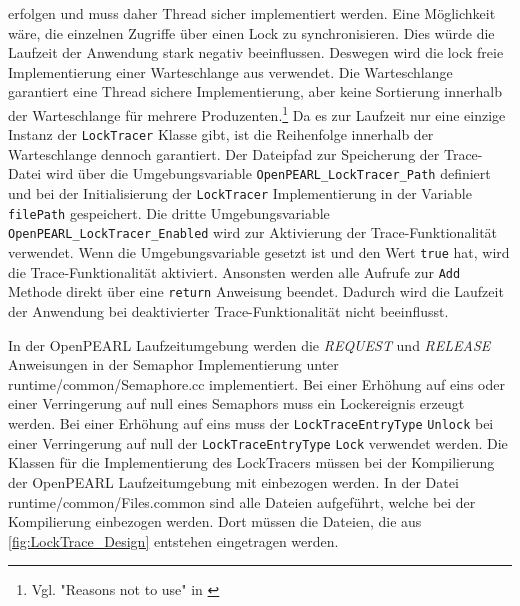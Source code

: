 erfolgen und muss daher Thread sicher implementiert werden. Eine Möglichkeit
wäre, die einzelnen Zugriffe über einen Lock zu synchronisieren. Dies würde die
Laufzeit der Anwendung stark negativ beeinflussen. Deswegen wird die lock freie
Implementierung einer Warteschlange aus \autocite{Moody_Camels_Concurrentqueue}
verwendet. Die Warteschlange garantiert eine Thread sichere Implementierung,
aber keine Sortierung innerhalb der Warteschlange für mehrere
Produzenten.\footnote{Vgl. "Reasons not to use" in
\autocite{Moody_Camels_Concurrentqueue}} Da es zur Laufzeit nur eine einzige
Instanz der \texttt{Lock\-Tracer} Klasse gibt, ist die Reihenfolge innerhalb der
Warteschlange dennoch garantiert. Der Dateipfad zur Speicherung der Trace-Datei
wird über die Umgebungsvariable \texttt{OpenPEARL\_LockTracer\_Path} definiert
und bei der Initialisierung der
\texttt{LockTracer} Implementierung in der Variable \texttt{filePath}
gespeichert. Die dritte Umgebungsvariable
\texttt{OpenPEARL\_LockTracer\_Enabled} wird zur Aktivierung der
Trace-Funktionalität verwendet. Wenn die Umgebungsvariable gesetzt ist und den
Wert \texttt{true} hat, wird die Trace-Funktionalität aktiviert. Ansonsten
werden alle Aufrufe zur \texttt{Add} Methode direkt über eine \texttt{return}
Anweisung beendet. Dadurch wird die Laufzeit der Anwendung bei deaktivierter
Trace-Funktionalität nicht beeinflusst.

In der OpenPEARL Laufzeitumgebung werden die \emph{REQUEST} und \emph{RELEASE}
Anweisungen in der Semaphor Implementierung unter runtime/common/Semaphore.cc
implementiert. Bei einer Erhöhung auf eins oder einer Verringerung auf null
eines Semaphors muss ein Lockereignis erzeugt werden. Bei einer Erhöhung auf
eins muss der \texttt{Lock\-Trace\-Entry\-Type} \texttt{Unlock} bei einer
Verringerung auf null der \texttt{Lock\-Trace\-Entry\-Type} \texttt{Lock}
verwendet werden. Die Klassen für die Implementierung des LockTracers müssen bei
der Kompilierung der OpenPEARL Laufzeitumgebung mit einbezogen werden. In der
Datei runtime/common/Files.common sind alle Dateien aufgeführt, welche bei der
Kompilierung einbezogen werden. Dort müssen die Dateien, die aus
\cref{fig:LockTrace_Design} entstehen eingetragen werden.

